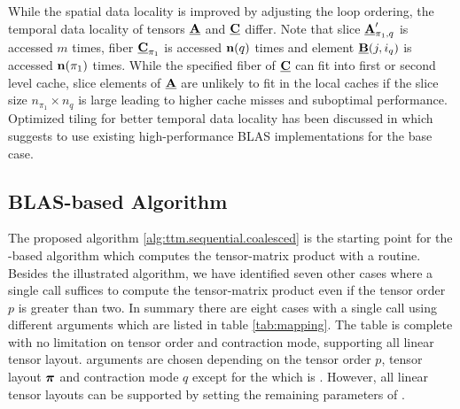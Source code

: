 While the spatial data locality is improved by adjusting the loop ordering, the temporal data locality of tensors $\underline{\mathbf{A}}$ and $\underline{\mathbf{C}}$ differ.
Note that slice $\underline{\mathbf{A}}_{\pi_1,q}'$ is accessed $m$ times, fiber $\underline{\mathbf{C}}_{\pi_1}$ is accessed $\mathbf{n}(q)$ times and element $\underline{\mathbf{B}}(j,i_q)$ is accessed $\mathbf{n}(\pi_1)$ times.
While the specified fiber of $\underline{\mathbf{C}}$ can fit into first or second level cache, slice elements of $\underline{\mathbf{A}}$ are unlikely to fit in the local caches if the slice size $n_{\pi_1} \times n_q$ is large leading to higher cache misses and suboptimal performance.
Optimized tiling for better temporal data locality has been discussed in \cite{goto:2008:gemm} which suggests to use existing high-performance BLAS implementations for the base case.

\subsection{BLAS-based Algorithm}
\label{subsec:linear.algebra.routines}
The proposed algorithm \ref{alg:ttm.sequential.coalesced} is the starting point for the -based algorithm which computes the tensor-matrix product with a  routine.
Besides the illustrated algorithm, we have identified seven other cases where a single  call suffices to compute the tensor-matrix product even if the tensor order $p$ is greater than two.
In summary there are eight cases with a single  call using different arguments which are listed in table \ref{tab:mapping}.
The table is complete with no limitation on tensor order and contraction mode, supporting all linear tensor layout.
 arguments are chosen depending on the tensor order $p$, tensor layout $\boldsymbol{\pi}$ and contraction mode $q$ except for the  which is .
However, all linear tensor layouts can be supported by setting the remaining parameters of .

